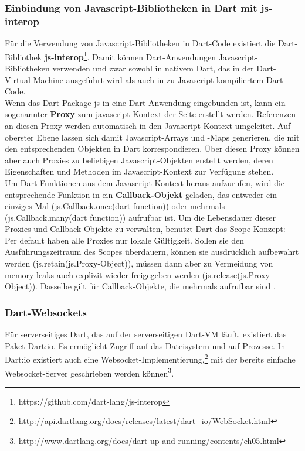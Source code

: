 \subsubsection{Einbindung von Javascript-Bibliotheken in Dart mit js-interop}\label{js-interop}
Für die Verwendung von Javascript-Bibliotheken in Dart-Code existiert die Dart-Bibliothek {\bf js-interop}\footnote{https://github.com/dart-lang/js-interop}. Damit können Dart-Anwendungen Javascript-Bibliotheken verwenden und zwar sowohl in nativem Dart, das in der Dart-Virtual-Machine ausgeführt wird als auch in zu Javascript kompiliertem Dart-Code.\\

Wenn das Dart-Package js in eine Dart-Anwendung eingebunden ist, kann ein sogenannter {\bf Proxy} zum javascript-Kontext der Seite erstellt werden. Referenzen an diesen Proxy werden automatisch in den Javascript-Kontext umgeleitet. Auf oberster Ebene lassen sich damit Javascript-Arrays und -Maps generieren, die mit den entsprechenden Objekten in Dart korrespondieren. Über diesen Proxy können aber auch Proxies zu beliebigen Javascript-Objekten erstellt werden, deren Eigenschaften und Methoden im Javascript-Kontext zur Verfügung stehen.\\

Um Dart-Funktionen aus dem Javascript-Kontext heraus aufzurufen, wird die entsprechende Funktion in ein {\bf Callback-Objekt} geladen, das entweder ein einziges Mal (js.Callback.once(dart function)) oder mehrmals (js.Callback.many(dart function)) aufrufbar ist. Um die Lebensdauer dieser Proxies und Callback-Objekte zu verwalten, benutzt Dart das Scope-Konzept: Per default haben alle Proxies nur lokale Gültigkeit. Sollen sie den Ausführungszeitraum des Scopes überdauern, können sie ausdrücklich aufbewahrt werden (js.retain(js.Proxy-Object)), müssen dann aber zu Vermeidung von memory leaks auch explizit wieder freigegeben werden (js.release(js.Proxy-Object)). Dasselbe gilt für Callback-Objekte, die mehrmals aufrufbar sind \cite{js-interop}.

\subsubsection{Dart-Websockets}
Für serverseitiges Dart, das auf der serverseitigen Dart-VM läuft. existiert das Paket Dart:io. Es ermöglicht Zugriff auf das Dateisystem und auf Prozesse. In Dart:io existiert auch eine Websocket-Implementierung,\footnote{http://api.dartlang.org/docs/releases/latest/dart\_io/WebSocket.html} mit der bereits einfache Websocket-Server geschrieben werden können\footnote{http://www.dartlang.org/docs/dart-up-and-running/contents/ch05.html}.
